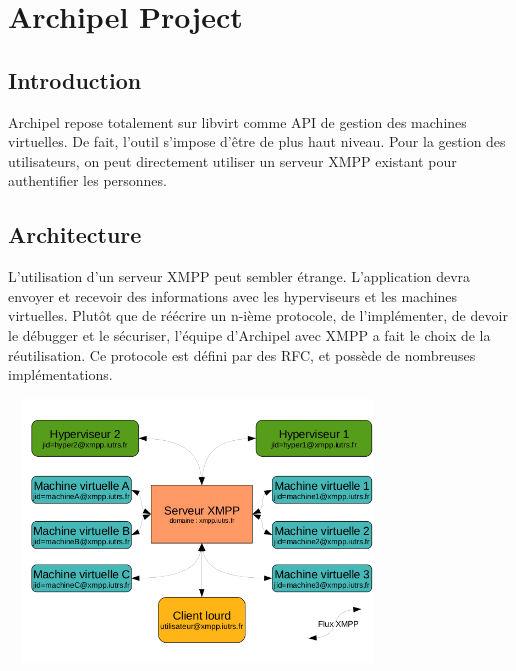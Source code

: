   \chapter{Archipel Project}
    \section{Introduction}
Archipel repose totalement sur libvirt comme API de gestion des machines virtuelles. De fait, l'outil
s'impose d'être de plus haut niveau. Pour la gestion des utilisateurs, on peut directement utiliser un
serveur XMPP existant pour authentifier les personnes.

    \section{Architecture}
L'utilisation d'un serveur XMPP peut sembler étrange. L'application devra envoyer et recevoir des
informations avec les hyperviseurs et les machines virtuelles. Plutôt que de réécrire un n-ième protocole,
de l'implémenter, de devoir le débugger et le sécuriser, l'équipe d'Archipel avec XMPP a fait le choix de la
réutilisation. Ce protocole est défini par des RFC, et possède de nombreuses implémentations.
\begin{center}
\includegraphics[width=10cm,height=7cm]{images/archi_archipel.png}
\end{center}


